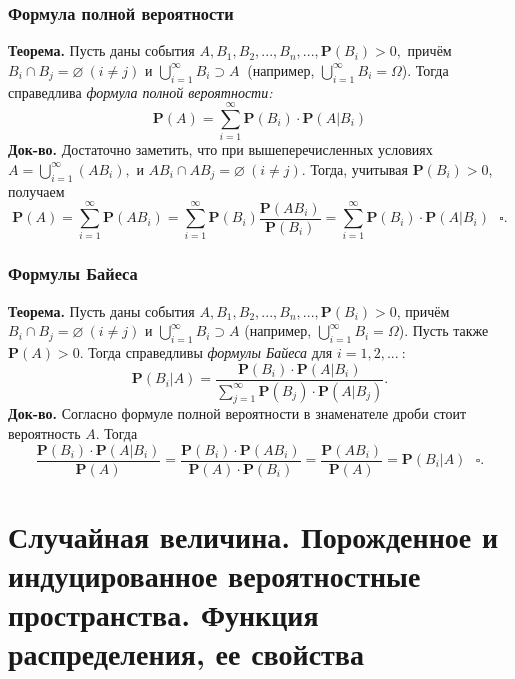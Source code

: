 \documentclass[oneside,final,14pt]{extreport}
\newcommand\myth{{\bf Теорема.}}
\newcommand\myqed{{\bf Док-во.}}
\newcommand\myprob[1]{{\mathbf{P}(#1)}}
\theoremstyle{definition}
\begin{document}
\subsubsection{Формула полной вероятности}
\myth{} Пусть даны события $A, B_1, B_2, ..., B_n, ..., \myprob{B_i} > 0, $ причём $B_i \cap B_j = \varnothing~(i \neq j)$ и $\bigcup\limits_{i=1}^{\infty}B_i \supset A~$ (например, $\bigcup\limits_{i=1}^{\infty}B_i = \Omega$). Тогда справедлива {\it формула полной вероятности:}
$$\mathbf{P}(A)=\sum_{i=1}^{\infty} \mathbf{P}\left(B_{i}\right) \cdot \mathbf{P}\left(A | B_{i}\right)$$
\myqed{} Достаточно заметить, что при вышеперечисленных условиях $A = \bigcup\limits_{i=1}^{\infty}(AB_i),$ и $AB_i \cap AB_j = \varnothing ~(i \neq j).$ Тогда, учитывая $\myprob{B_i} > 0$, получаем
$$\mathbf{P}(A)=\sum_{i=1}^{\infty} \mathbf{P}\left(A B_{i}\right)=\sum_{i=1}^{\infty} \mathbf{P}\left(B_{i}\right) \frac{\mathbf{P}\left(A B_{i}\right)}{\mathbf{P}\left(B_{i}\right)}=\sum_{i=1}^{\infty} \mathbf{P}\left(B_{i}\right) \cdot \mathbf{P}\left(A | B_{i}\right) ~~~ \square.$$

\subsubsection{Формулы Байеса}
\myth{} Пусть даны события $A, B_1, B_2, ..., B_n, ..., \myprob{B_i} > 0$, причём $B_i \cap B_j = \varnothing ~(i \neq j)$ и $\bigcup\limits_{i=1}^\infty B_i \supset A$ (например, $\bigcup\limits_{i=1}^{\infty}B_i = \Omega$). Пусть также $\myprob{A} > 0$. Тогда справедливы {\it формулы Байеса} для $i = 1, 2, ...~$:
$$\mathbf{P}\left(B_{i} | A\right)=\frac{\mathbf{P}\left(B_{i}\right) \cdot \mathbf{P}\left(A | B_{i}\right)}{\sum\limits_{j=1}^{\infty} \mathbf{P}\left(B_{j}\right) \cdot \mathbf{P}\left(A | B_{j}\right)}.$$
\myqed{} Согласно формуле полной вероятности в знаменателе дроби стоит вероятность $A$. Тогда $$\frac{\mathbf{P}\left(B_{i}\right) \cdot \mathbf{P}\left(A | B_{i}\right)}{\mathbf{P}(A)}=\frac{\mathbf{P}\left(B_{i}\right) \cdot \mathbf{P}\left(A B_{i}\right)}{\mathbf{P}(A) \cdot \mathbf{P}\left(B_{i}\right)}=\frac{\mathbf{P}\left(A B_{i}\right)}{\mathbf{P}(A)}=\mathbf{P}\left(B_{i} | A\right) ~~~ \square.$$

\section{Случайная величина. Порожденное и индуцированное вероятностные пространства. Функция распределения, ее свойства}
\end{document}
